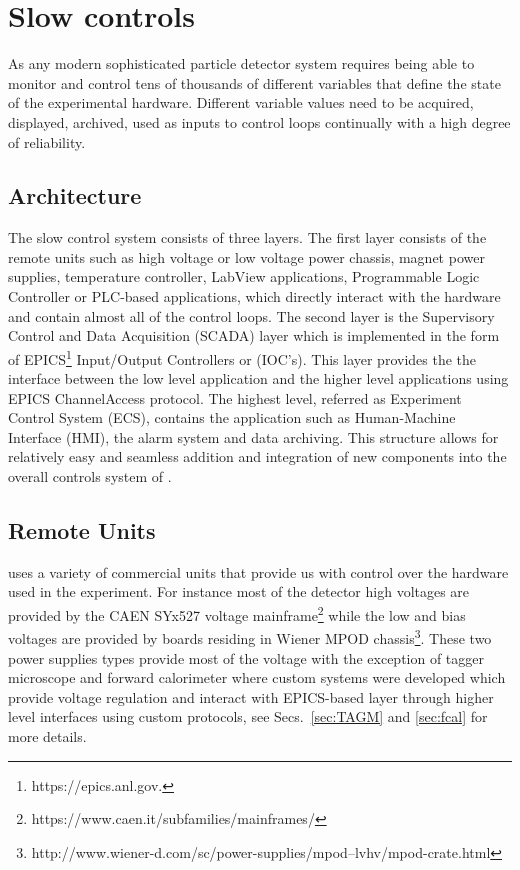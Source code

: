 
\section[Slow controls]{Slow controls \label{sec:controls}}
As any modern sophisticated particle detector system \gx{} requires being able to monitor 
and control tens of thousands of different variables that define the state of the experimental hardware. Different variable values need to be acquired, displayed, archived, used as inputs to control loops continually with a high degree of reliability. 

\subsection{Architecture \label{sec:controlsarchitechture}}
The \gx{} slow control system consists of three layers. The first layer consists of the remote units such as high voltage or low voltage power chassis, magnet power supplies, temperature controller, LabView applications, Programmable Logic Controller or PLC-based applications, which directly interact with the hardware and contain almost all of the control loops. The second layer is the Supervisory Control and Data Acquisition (SCADA) layer which is implemented in the form of EPICS\footnote{https://epics.anl.gov.} Input/Output Controllers or (IOC's). This layer provides the the interface between the low level application and the higher level applications using EPICS ChannelAccess protocol. The highest level, referred as Experiment Control System (ECS), contains the application such as Human-Machine Interface (HMI), the alarm system and data archiving. This structure allows for relatively easy and seamless addition and integration of new components into the overall controls system of \gx{}.    

\subsection{Remote Units \label{sec:controlsinterface}}
\gx{} uses a variety of commercial units that provide us with control over the hardware used in the experiment. For instance most of the detector high voltages are provided by the CAEN SYx527 voltage mainframe\footnote{https://www.caen.it/subfamilies/mainframes/} while the low and bias voltages are provided by boards residing in Wiener MPOD chassis\footnote{http://www.wiener-d.com/sc/power-supplies/mpod--lvhv/mpod-crate.html}. These two power supplies types provide most of the voltage with the exception of tagger microscope and forward calorimeter where custom systems were developed which provide voltage regulation and interact with EPICS-based layer through higher level interfaces using custom protocols, see Secs.~\ref{sec:TAGM} and \ref{sec:fcal} for more details.  

